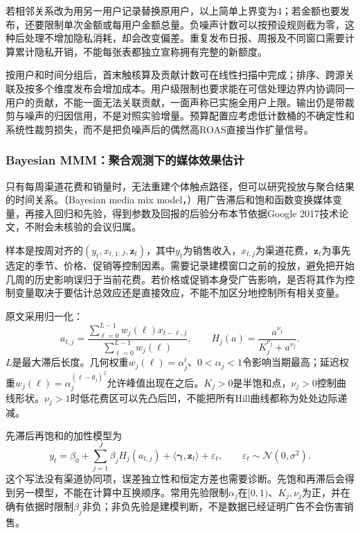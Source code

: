 若相邻关系改为用另一用户记录替换原用户，以上简单上界变为4；若金额也要发布，还要限制单次金额或每用户金额总量。负噪声计数可以按预设规则截为零，这种后处理不增加隐私消耗，却会改变偏差。重复发布日报、周报及不同窗口需要计算累计隐私开销，不能每张表都独立宣称拥有完整的新额度。

按用户和时间分组后，首末触核算及贡献计数可在线性扫描中完成；排序、跨源关联及按多个维度发布会增加成本。用户级限制也要求能在可信处理边界内协调同一用户的贡献，不能一面无法关联贡献，一面声称已实施全用户上限。输出仍是带裁剪与噪声的归因信用，不是对照实验增量。预算配置应考虑低计数桶的不确定性和系统性裁剪损失，而不是把负噪声后的偶然高ROAS直接当作扩量信号。

\subsubsection{Bayesian MMM：聚合观测下的媒体效果估计}
\label{sec:rs-advertising-mmm}

只有每周渠道花费和销量时，无法重建个体触点路径，但可以研究投放与聚合结果的时间关系。（Bayesian media mix model，）用广告滞后和饱和函数变换媒体变量，再接入回归和先验，得到参数及回报的后验分布本节依据Google 2017技术论文，不附会未核验的会议归属。

样本是按周对齐的$(y_t,x_{t,1:J},\bm z_t)$，其中$y_t$为销售收入，$x_{t,j}$为渠道花费，$\bm z_t$为事先选定的季节、价格、促销等控制因素。需要记录建模窗口之前的投放，避免把开始几周的历史影响误归于当前花费。若价格或促销本身受广告影响，是否将其作为控制变量取决于要估计总效应还是直接效应，不能不加区分地控制所有相关变量。

原文采用归一化：
\begin{equation}
  a_{t,j}
   =\frac{\sum_{\ell=0}^{L-1}w_j(\ell)x_{t-\ell,j}}
           {\sum_{\ell=0}^{L-1}w_j(\ell)},\qquad
  H_j(a)=\frac{a^{\nu_j}}{K_j^{\nu_j}+a^{\nu_j}}.
  \label{eq:rs-advertising-mmm-transform}
\end{equation}
$L$是最大滞后长度。几何权重$w_j(\ell)=\alpha_j^\ell$、$0<\alpha_j<1$令影响当期最高；延迟权重$w_j(\ell)=\alpha_j^{(\ell-\theta_j)^2}$允许峰值出现在之后。$K_j>0$是半饱和点，$\nu_j>0$控制曲线形状。$\nu_j>1$时低花费区可以先凸后凹，不能把所有Hill曲线都称为处处边际递减。

先滞后再饱和的加性模型为
\begin{equation}
  y_t=\beta_0+\sum_{j=1}^{J}\beta_jH_j(a_{t,j})
           +\langle\bm\gamma,\bm z_t\rangle+\varepsilon_t,
   \qquad \varepsilon_t\sim\mathcal N(0,\sigma^2).
  \label{eq:rs-advertising-mmm-regression}
\end{equation}
这个写法没有渠道协同项，误差独立性和恒定方差也需要诊断。先饱和再滞后会得到另一模型，不能在计算中互换顺序。常用先验限制$\alpha_j$在$[0,1)$、$K_j,\nu_j$为正，并在确有依据时限制$\beta_j$非负；非负先验是建模判断，不是数据已经证明广告不会伤害销售。

